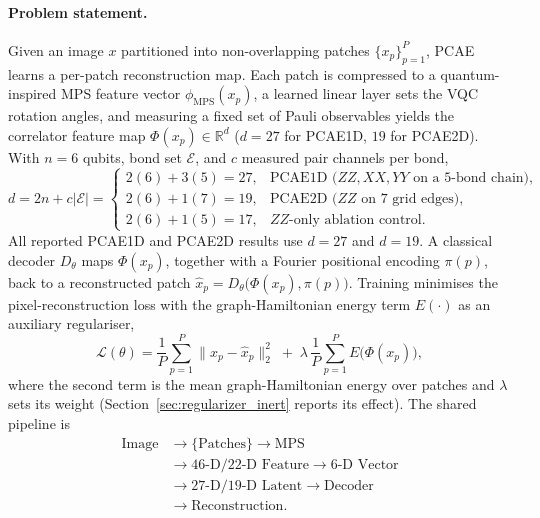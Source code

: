 \documentclass[pdflatex,sn-basic]{sn-jnl}
\begin{document}
\paragraph{Problem statement.}
Given an image $x$ partitioned into non-overlapping patches
$\{x_p\}_{p=1}^{P}$, PCAE learns a per-patch reconstruction map. Each patch is
compressed to a quantum-inspired MPS feature vector $\phi_{\mathrm{MPS}}(x_p)$, a learned
linear layer sets the VQC rotation angles, and measuring a fixed set of Pauli
observables yields the correlator feature map
$\Phi(x_p)\in\mathbb{R}^{d}$ ($d=27$ for PCAE1D, $19$ for PCAE2D).
With $n=6$ qubits, bond set $\mathcal{E}$, and $c$ measured pair channels per bond,
\begin{equation}
  \label{eq:obs_dim}
  d=2n+c\lvert\mathcal{E}\rvert=
  \begin{cases}
    2(6)+3(5)=27, & \text{PCAE1D ($ZZ,XX,YY$ on a 5-bond chain)},\\
    2(6)+1(7)=19, & \text{PCAE2D ($ZZ$ on 7 grid edges)},\\
    2(6)+1(5)=17, & \text{$ZZ$-only ablation control}.
  \end{cases}
\end{equation}
All reported PCAE1D and PCAE2D results use $d=27$ and $d=19$.
A classical
decoder $D_\theta$ maps $\Phi(x_p)$, together with a Fourier positional encoding
$\pi(p)$, back to a reconstructed patch $\hat{x}_p=D_\theta\!\big(\Phi(x_p),\pi(p)\big)$.
Training minimises the pixel-reconstruction loss with the graph-Hamiltonian energy
term $E(\cdot)$ as an auxiliary regulariser,
\begin{equation}
  \label{eq:objective}
  \mathcal{L}(\theta)=\frac{1}{P}\sum_{p=1}^{P}\big\|x_p-\hat{x}_p\big\|_2^{2}
  \;+\;\lambda\,\frac{1}{P}\sum_{p=1}^{P}E\big(\Phi(x_p)\big),
\end{equation}
where the second term is the mean graph-Hamiltonian
energy over patches and $\lambda$ sets its weight
(Section~\ref{sec:regularizer_inert} reports its effect). The shared pipeline is
\begin{equation}
\begin{aligned}
\text{Image}
  &\rightarrow \{\text{Patches}\} \rightarrow \text{MPS}\\
  &\rightarrow \text{46-D/22-D Feature} \rightarrow \text{6-D Vector}\\
  &\rightarrow \text{27-D/19-D Latent} \rightarrow \text{Decoder}\\
  &\rightarrow \text{Reconstruction}.
\end{aligned}
\end{equation}
\end{document}
